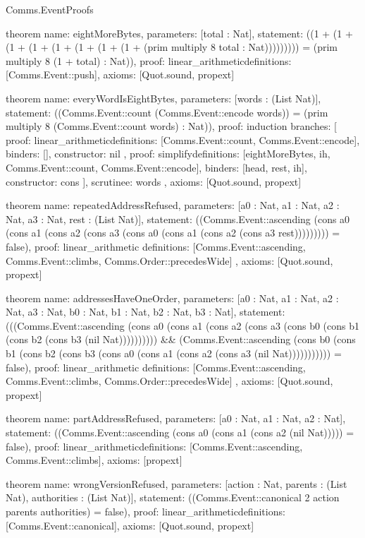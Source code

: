 \begin{lexlean}{Comms.EventProofs}
\begin{semanticmodule}
theorem{
  name: eightMoreBytes,
  parameters: [total : Nat],
  statement: ((1 + (1 + (1 + (1 + (1 + (1 + (1 + (1 + (prim multiply 8 total : Nat))))))))) = (prim multiply 8 (1 + total) : Nat)),
  proof: linear_arithmetic{definitions: [Comms.Event::push]},
  axioms: [Quot.sound, propext]
}

theorem{
  name: everyWordIsEightBytes,
  parameters: [words : (List Nat)],
  statement: ((Comms.Event::count (Comms.Event::encode words)) = (prim multiply 8 (Comms.Event::count words) : Nat)),
  proof: induction{
    branches: [
      {
        proof: linear_arithmetic{definitions: [Comms.Event::count, Comms.Event::encode]},
        binders: [],
        constructor: nil
      },
      {
        proof: simplify{definitions: [eightMoreBytes, ih, Comms.Event::count, Comms.Event::encode]},
        binders: [head, rest, ih],
        constructor: cons
      }
    ],
    scrutinee: words
  },
  axioms: [Quot.sound, propext]
}

theorem{
  name: repeatedAddressRefused,
  parameters: [a0 : Nat, a1 : Nat, a2 : Nat, a3 : Nat, rest : (List Nat)],
  statement: ((Comms.Event::ascending (cons a0 (cons a1 (cons a2 (cons a3 (cons a0 (cons a1 (cons a2 (cons a3 rest))))))))) = false),
  proof: linear_arithmetic{
    definitions: [Comms.Event::ascending, Comms.Event::climbs, Comms.Order::precedesWide]
  },
  axioms: [Quot.sound, propext]
}

theorem{
  name: addressesHaveOneOrder,
  parameters: [a0 : Nat, a1 : Nat, a2 : Nat, a3 : Nat, b0 : Nat, b1 : Nat, b2 : Nat, b3 : Nat],
  statement: (((Comms.Event::ascending (cons a0 (cons a1 (cons a2 (cons a3 (cons b0 (cons b1 (cons b2 (cons b3 (nil Nat)))))))))) && (Comms.Event::ascending (cons b0 (cons b1 (cons b2 (cons b3 (cons a0 (cons a1 (cons a2 (cons a3 (nil Nat))))))))))) = false),
  proof: linear_arithmetic{
    definitions: [Comms.Event::ascending, Comms.Event::climbs, Comms.Order::precedesWide]
  },
  axioms: [Quot.sound, propext]
}

theorem{
  name: partAddressRefused,
  parameters: [a0 : Nat, a1 : Nat, a2 : Nat],
  statement: ((Comms.Event::ascending (cons a0 (cons a1 (cons a2 (nil Nat))))) = false),
  proof: linear_arithmetic{definitions: [Comms.Event::ascending, Comms.Event::climbs]},
  axioms: [propext]
}

theorem{
  name: wrongVersionRefused,
  parameters: [action : Nat, parents : (List Nat), authorities : (List Nat)],
  statement: ((Comms.Event::canonical 2 action parents authorities) = false),
  proof: linear_arithmetic{definitions: [Comms.Event::canonical]},
  axioms: [Quot.sound, propext]
}


\end{semanticmodule}
\end{lexlean}
